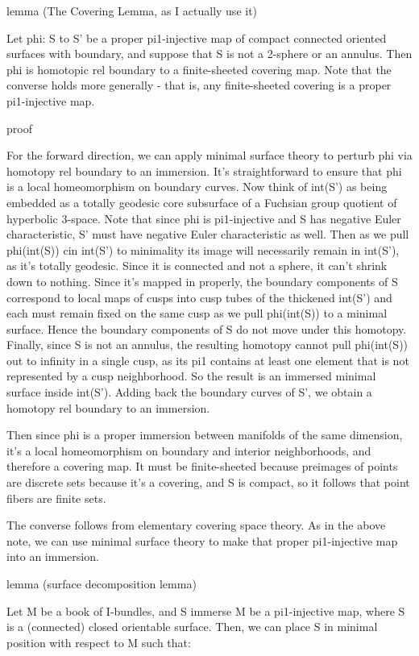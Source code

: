 lemma (The Covering Lemma, as I actually use it)

Let phi: S to S' be a proper pi1-injective map of compact connected oriented
surfaces with boundary, and suppose that S is not a 2-sphere or an annulus.
Then phi is homotopic rel boundary to a finite-sheeted covering map.  Note that
the converse holds more generally - that is, any finite-sheeted covering is
a proper pi1-injective map.

proof

For the forward direction, we can apply minimal surface theory to perturb phi
via homotopy rel boundary to an immersion. It's straightforward to ensure that
phi is a local homeomorphism on boundary curves. Now think of int(S') as being
embedded as a totally geodesic core subsurface of a Fuchsian group quotient of
hyperbolic 3-space. Note that since phi is pi1-injective and S has negative
Euler characteristic, S' must have negative Euler characteristic as well. Then
as we pull phi(int(S)) cin int(S') to minimality its image will necessarily
remain in int(S'), as it's totally geodesic.  Since it is connected and not
a sphere, it can't shrink down to nothing. Since it's mapped in properly, the
boundary components of S correspond to local maps of cusps into cusp tubes of
the thickened int(S') and each must remain fixed on the same cusp as we pull
phi(int(S)) to a minimal surface.  Hence the boundary components of S do not
move under this homotopy.  Finally, since S is not an annulus, the resulting
homotopy cannot pull phi(int(S)) out to infinity in a single cusp, as its pi1
contains at least one element that is not represented by a cusp neighborhood.
So the result is an immersed minimal surface inside int(S'). Adding back the
boundary curves of S', we obtain a homotopy rel boundary to an immersion.

Then since phi is a proper immersion between manifolds of the same dimension,
it's a local homeomorphism on boundary and interior neighborhoods, and
therefore a covering map. It must be finite-sheeted because preimages of points
are discrete sets because it's a covering, and S is compact, so it follows that
point fibers are finite sets.

The converse follows from elementary covering space theory. As in the above
note, we can use minimal surface theory to make that proper pi1-injective map
into an immersion.

lemma (surface decomposition lemma)

Let M be a book of I-bundles, and S immerse M be a pi1-injective map, where
S is a (connected) closed orientable surface.  Then, we can place S in minimal
position with respect to M such that:

